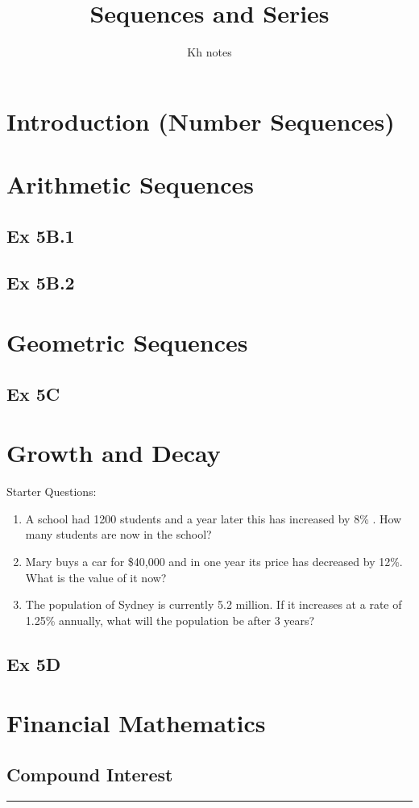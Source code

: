 \documentclass[12pt]{article}
\title{Sequences and Series}
\author{Kh notes}
\date{}
\begin{document}
	\maketitle
\tableofcontents
\newpage
\section{Introduction (Number Sequences)}
\section{Arithmetic Sequences}
\subsection{Ex 5B.1}
\subsection{Ex 5B.2}
\section{Geometric  Sequences}
\subsection{Ex 5C}
\section{Growth and Decay}
Starter Questions:
\begin{enumerate}
	\item A school had 1200 students and a year later this has increased by 8\% . How many students are now in the school?
	\item Mary buys a car for \$40,000 and in one year its price has decreased by 12\%. What is the value of it now?
	\item The population of Sydney is currently 5.2 million. If it increases at a rate of 1.25\% annually, what will the population be after 3 years?
\end{enumerate}
\subsection{Ex 5D}
\section{Financial Mathematics}
\subsection{Compound Interest}
\hrule\vspace{0.5cm}
\end{document}
